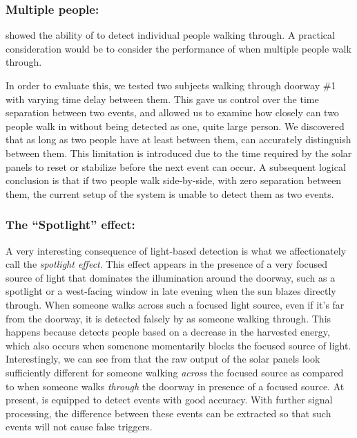 \subsubsection{Multiple people:}
 showed the ability of \sysname to detect individual people walking through.
A practical consideration would be to consider the performance of \sysname when multiple people walk through.

In order to evaluate this, we tested two subjects walking through doorway \#1 with varying time delay between them.
This gave us control over the time separation between two events, and allowed us to examine how closely can two people walk in without being detected as one, quite large person.
We discovered that as long as two people have at least \minSeparation between them, \sysname can accurately distinguish between them.
This limitation is introduced due to the time required by the solar panels to reset or stabilize before the next event can occur.
A subsequent logical conclusion is that if two people walk side-by-side, \ie with zero separation between them, the current setup of the system is unable to detect them as two events.

\subsubsection{The ``Spotlight'' effect:}
A very interesting consequence of light-based detection is what we affectionately call the \textit{spotlight effect}.
This effect appears in the presence of a very focused source of light that dominates the illumination around the doorway, such as a spotlight or a west-facing window in late evening when the sun blazes directly through.
When someone walks across such a focused light source, even if it's far from the doorway, it is detected falsely by \sysname as someone walking through.
This happens because \sysname detects people based on a decrease in the harvested energy, which also occurs when somenone momentarily blocks the focused source of light.
Interestingly, we can see from  that the raw output of the solar panels look sufficiently different for someone walking \textit{across} the focused source as compared to when someone walks \textit{through} the doorway in presence of a focused source.
At present, \sysname is equipped to detect events with good accuracy.
With further signal processing, the difference between these events can be extracted so that such events will not cause false triggers.

